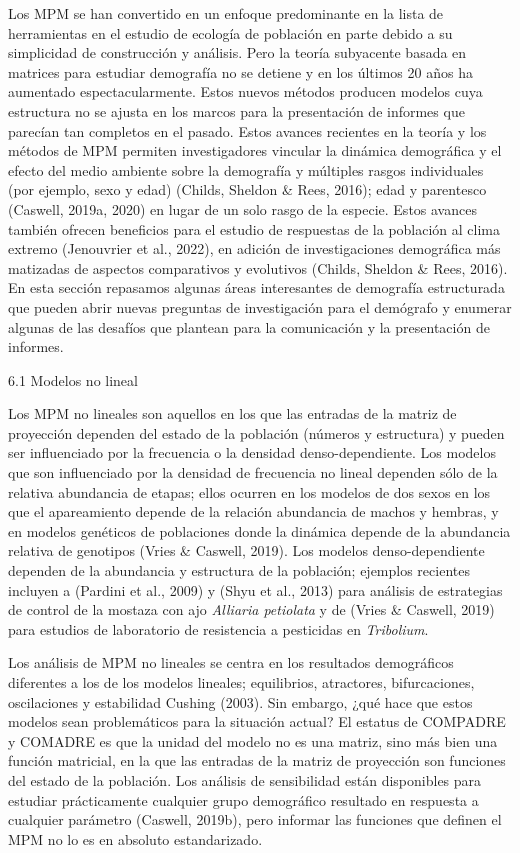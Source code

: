 \documentclass[
  12pt,
  letterpaper,
]{book}
\begin{document}
Los MPM se han convertido en un enfoque predominante en la lista de
herramientas en el estudio de ecología de población en parte debido a su
simplicidad de construcción y análisis. Pero la teoría subyacente basada
en matrices para estudiar demografía no se detiene y en los últimos 20
años ha aumentado espectacularmente. Estos nuevos métodos producen
modelos cuya estructura no se ajusta en los marcos para la presentación
de informes que parecían tan completos en el pasado. Estos avances
recientes en la teoría y los métodos de MPM permiten investigadores
vincular la dinámica demográfica y el efecto del medio ambiente sobre la
demografía y múltiples rasgos individuales (por ejemplo, sexo y edad)
(Childs, Sheldon \& Rees, 2016); edad y parentesco (Caswell, 2019a,
2020) en lugar de un solo rasgo de la especie. Estos avances también
ofrecen beneficios para el estudio de respuestas de la población al
clima extremo (Jenouvrier et al., 2022), en adición de investigaciones
demográfica más matizadas de aspectos comparativos y evolutivos (Childs,
Sheldon \& Rees, 2016). En esta sección repasamos algunas áreas
interesantes de demografía estructurada que pueden abrir nuevas
preguntas de investigación para el demógrafo y enumerar algunas de las
desafíos que plantean para la comunicación y la presentación de
informes.

6.1 \textbar{} Modelos no lineal

Los MPM no lineales son aquellos en los que las entradas de la matriz de
proyección dependen del estado de la población (números y estructura) y
pueden ser influenciado por la frecuencia o la densidad
denso-dependiente. Los modelos que son influenciado por la densidad de
frecuencia no lineal dependen sólo de la relativa abundancia de etapas;
ellos ocurren en los modelos de dos sexos en los que el apareamiento
depende de la relación abundancia de machos y hembras, y en modelos
genéticos de poblaciones donde la dinámica depende de la abundancia
relativa de genotipos (Vries \& Caswell, 2019). Los modelos
denso-dependiente dependen de la abundancia y estructura de la
población; ejemplos recientes incluyen a (Pardini et al., 2009) y (Shyu
et al., 2013) para análisis de estrategias de control de la mostaza con
ajo \emph{Alliaria petiolata} y de (Vries \& Caswell, 2019) para
estudios de laboratorio de resistencia a pesticidas en \emph{Tribolium}.

Los análisis de MPM no lineales se centra en los resultados demográficos
diferentes a los de los modelos lineales; equilibrios, atractores,
bifurcaciones, oscilaciones y estabilidad Cushing (2003). Sin embargo,
¿qué hace que estos modelos sean problemáticos para la situación actual?
El estatus de COMPADRE y COMADRE es que la unidad del modelo no es una
matriz, sino más bien una función matricial, en la que las entradas de
la matriz de proyección son funciones del estado de la población. Los
análisis de sensibilidad están disponibles para estudiar prácticamente
cualquier grupo demográfico resultado en respuesta a cualquier parámetro
(Caswell, 2019b), pero informar las funciones que definen el MPM no lo
es en absoluto estandarizado.
\end{document}
